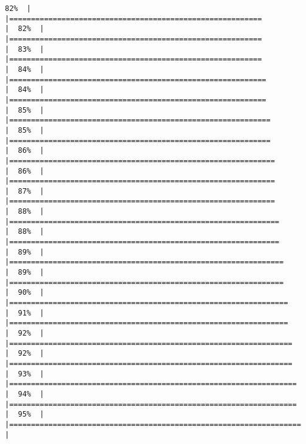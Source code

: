 \documentclass[
]{book}
\begin{document}
\begin{verbatim}
82%  |                                                                              |==========================================================            |  82%  |                                                                              |==========================================================            |  83%  |                                                                              |==========================================================            |  84%  |                                                                              |===========================================================           |  84%  |                                                                              |===========================================================           |  85%  |                                                                              |============================================================          |  85%  |                                                                              |============================================================          |  86%  |                                                                              |=============================================================         |  86%  |                                                                              |=============================================================         |  87%  |                                                                              |=============================================================         |  88%  |                                                                              |==============================================================        |  88%  |                                                                              |==============================================================        |  89%  |                                                                              |===============================================================       |  89%  |                                                                              |===============================================================       |  90%  |                                                                              |================================================================      |  91%  |                                                                              |================================================================      |  92%  |                                                                              |=================================================================     |  92%  |                                                                              |=================================================================     |  93%  |                                                                              |==================================================================    |  94%  |                                                                              |==================================================================    |  95%  |                                                                              |===================================================================   |  
\end{verbatim}
\end{document}
